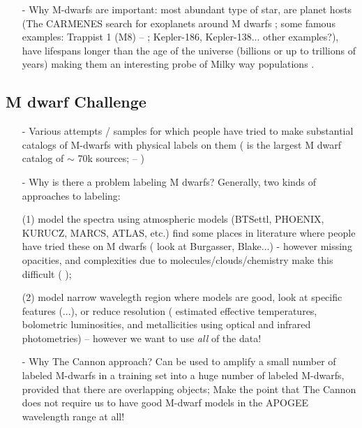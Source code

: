 \documentclass[modern]{aastex62}
\begin{document}
\begin{enumerate}
\item[-] Why M-dwarfs are important: most abundant type of star, are planet hosts (The CARMENES search for exoplanets around M dwarfs \citealt{Trifonov:2018}; some famous examples: Trappist 1 (M8) -- \citealt{Gillon:2017}; Kepler-186, Kepler-138... other examples?), have lifespans longer than the age of the universe (billions or up to trillions of years) \citep{Laughlin:1997} making them an interesting probe of Milky way populations \citep{Bochanski:2007}. \color{red}{Need citations!}
\end{enumerate}

\subsection{M dwarf Challenge}
\begin{enumerate}
\item[-] Various attempts / samples for which people have tried to make substantial catalogs of M-dwarfs with physical labels on them (\citealt{West:2011} is the largest M dwarf catalog of $\sim$ 70k sources; \citealt{Deacon:2014} -- \color{red}{Need citations!}\color{black}) 

\item[-] Why is there a problem labeling M dwarfs? Generally, two kinds of approaches to labeling:

 (1) model the spectra using atmospheric models (BTSettl, PHOENIX, KURUCZ, MARCS, ATLAS, etc.) find some places in literature where people have tried these on M dwarfs (\color{red}{Need citations... }\color{black} look at Burgasser, Blake...) - however missing opacities, and complexities due to molecules/clouds/chemistry make this difficult (\color{red}{Need citations... }\color{black} \citealt{Allard:2013}); 

 (2) model narrow wavelegth region where models are good, look at specific features (\citealt{Rojas-Ayala:2012}...), or reduce resolution (\citealt{Casagrande:2008} estimated effective temperatures, bolometric luminosities, and metallicities using optical and infrared photometries) -- however we want to use \emph{all} of the data!


\item[-] Why The Cannon approach? Can be used to amplify a small number of labeled M-dwarfs in a training set into a huge number of labeled M-dwarfs, provided that there are overlapping objects; Make the point that The Cannon does not require us to have good M-dwarf models in the APOGEE wavelength range at all!

\end{enumerate}
\end{document}
